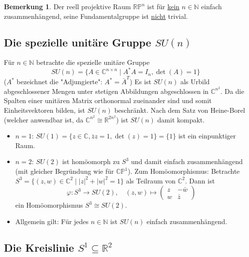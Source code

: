 \documentclass[a4paper,11pt,notitlepage]{report}
\theoremstyle{definition}
\newtheorem{remark}{Bemerkung}[chapter]
\newcommand{\R}{{\ensuremath{\mathbb{R}}}}
\newcommand{\N}{{\ensuremath{\mathbb{N}}}}
\newcommand{\C}{{\ensuremath{\mathbb{C}}}}
\newcommand{\Prim}{{\ensuremath{\mathbb{P}}}}
\begin{document}
\begin{remark}
	Der reell projektive Raum $\R \Prim^n$ ist für \underline{kein} $n \in \N$ einfach zusammenhängend, seine Fundamentalgruppe ist \underline{nicht} trivial.
\end{remark}

\subsection{Die spezielle unitäre Gruppe $SU(n)$}
Für $n \in \N$ betrachte die spezielle unitäre Gruppe $$SU(n) = \{ A \in \C^{n \times n} \mid A^* A = I_n, \det(A) = 1\}$$
($A^*$ bezeichnet die "Adjungierte":  $A^* = \bar{A}^T$) \newline
Es ist $SU(n)$ als Urbild abgeschlossener Mengen unter stetigen Abbildungen abgeschlossen in $\C^{n^2}$. Da die Spalten einer unitären Matrix orthonormal zueinander sind und somit Einheitsvektoren bilden, ist $SU(n)$ beschränkt. Nach dem Satz von Heine-Borel (welcher anwendbar ist, da $\C^{n^2} \cong \R^{2n^2}$) ist $SU(n)$ damit kompakt.
\begin{itemize}
	\item \underline{$n=1$}: $SU(1) = \{ z \in \C, \bar{z}z = 1, \det(z) = 1\} = \{1\}$ ist ein einpunktiger Raum.
	\item \underline{$n=2$}: $SU(2)$ ist homöomorph zu $S^3$ und damit einfach zusammenhängend (mit gleicher Begründung wie für $\C \Prim ^1$). \newline
	Zum Homöomorphismus:
	\newline
	Betrachte $S^3 = \{(z,w) \in \C^2 \mid |z|^2 + |w|^2 = 1 \}$ als Teilraum von $\C^2$.
	Dann ist
		$$\varphi \colon S^3 \rightarrow SU(2), \quad (z,w) \mapsto \begin{pmatrix}
		z & -\bar{w} \\ w & \bar{z}
		\end{pmatrix} $$
	ein Homöomorphismus $S^3 \cong SU(2)$.
	\item Allgemein gilt: Für jedes $n \in \N$ ist $SU(n)$ einfach zusammenhängend.
\end{itemize}

\subsection{Die Kreislinie $S^1 \subseteq \R^2$}
\end{document}
